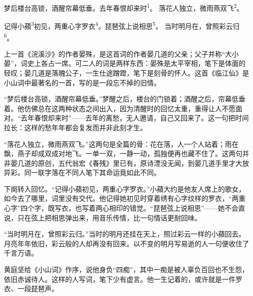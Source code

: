 
\begin{poem}
梦后楼台高锁，酒醒帘幕低垂。去年春恨却来时\textsuperscript{1}。
落花人独立，微雨燕双飞\textsuperscript{2}。

记得小蘋\textsuperscript{3}初见，两重心字罗衣\textsuperscript{4}。琵琶弦上说相思\textsuperscript{5}。
当时明月在，曾照彩云归\textsuperscript{6}。
\end{poem}

\begin{annotations}
\end{annotations}

\begin{appreciation}
上一首《浣溪沙》的作者晏殊，是这首词的作者晏几道的父亲；父子并称“大小晏”，词史上各占一席。可二人的词是两样东西：晏殊是太平宰相，笔下是体面的轻叹；晏几道是落魄公子，一生仕途蹭蹬，笔下是刻骨的怀人。这首《临江仙》是小山词中最著名的一首，写的是一段忘不掉的旧情。

“梦后楼台高锁，酒醒帘幕低垂。”梦醒之后，楼台的门锁着；酒醒之后，帘幕低垂着。他仿佛总在这两种状态之间出入，因为清醒时的回忆太重，重得让人不愿面对。“去年春恨却来时”——去年的离愁，无人邀请，自己又回来了。这一句把时间拉长：这样的愁年年都会复发而并非此刻才生。

“落花人独立，微雨燕双飞。”这两句是全篇的骨：花在落，人一个人站着；雨在飘，燕子却成双成对地飞。一单一双，一静一动，孤独便再也藏不住了。这两句并非晏几道的原创，五代翁宏《春残》里已有，原诗湮没无闻，到晏几道手里才大放异彩。同一联字落在不同人笔下其命运竟如此不同。

下阕转入回忆。“记得小蘋初见，两重心字罗衣。”小蘋大约是他友人席上的歌女，如今去了哪里，词里没有交代。他记得她初见时穿着绣有心字纹样的罗衣，“两重心字”四个字，既写衣，也写着两心相印的错觉。“琵琶弦上说相思”——她不会直说，只在弦上把相思弹出来，用音乐传情，比一句情话更耐回味。

“当时明月在，曾照彩云归。”当时的明月还挂在天上，照过彩云一样的小蘋回去。月亮年年依旧，彩云般的人却再没有回来。以不变的明月写易逝的人一句便收住了千言万语。

黄庭坚给《小山词》作序，说他身负“四痴”，其中一痴是被人辜负百回也不生怨，依旧赤诚待人。这样的人写词，笔下少有虚言。他一生记着的，或许就是一件罗衣、一段琵琶声。
\end{appreciation}

